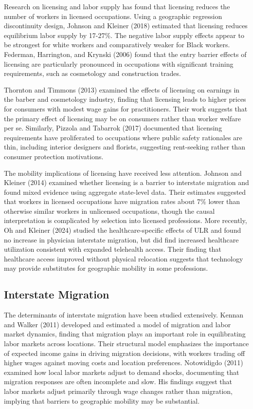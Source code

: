 \documentclass[12pt]{article}
\begin{document}
Research on licensing and labor supply has found that licensing reduces the number of workers in licensed occupations. Using a geographic regression discontinuity design, Johnson and Kleiner (2018) estimated that licensing reduces equilibrium labor supply by 17-27\%. The negative labor supply effects appear to be strongest for white workers and comparatively weaker for Black workers. Federman, Harrington, and Krynski (2006) found that the entry barrier effects of licensing are particularly pronounced in occupations with significant training requirements, such as cosmetology and construction trades.

Thornton and Timmons (2013) examined the effects of licensing on earnings in the barber and cosmetology industry, finding that licensing leads to higher prices for consumers with modest wage gains for practitioners. Their work suggests that the primary effect of licensing may be on consumers rather than worker welfare per se. Similarly, Pizzola and Tabarrok (2017) documented that licensing requirements have proliferated to occupations where public safety rationales are thin, including interior designers and florists, suggesting rent-seeking rather than consumer protection motivations.

The mobility implications of licensing have received less attention. Johnson and Kleiner (2014) examined whether licensing is a barrier to interstate migration and found mixed evidence using aggregate state-level data. Their estimates suggested that workers in licensed occupations have migration rates about 7\% lower than otherwise similar workers in unlicensed occupations, though the causal interpretation is complicated by selection into licensed professions. More recently, Oh and Kleiner (2024) studied the healthcare-specific effects of ULR and found no increase in physician interstate migration, but did find increased healthcare utilization consistent with expanded telehealth access. Their finding that healthcare access improved without physical relocation suggests that technology may provide substitutes for geographic mobility in some professions.

\subsection{Interstate Migration}

The determinants of interstate migration have been studied extensively. Kennan and Walker (2011) developed and estimated a model of migration and labor market dynamics, finding that migration plays an important role in equilibrating labor markets across locations. Their structural model emphasizes the importance of expected income gains in driving migration decisions, with workers trading off higher wages against moving costs and location preferences. Notowidigdo (2011) examined how local labor markets adjust to demand shocks, documenting that migration responses are often incomplete and slow. His findings suggest that labor markets adjust primarily through wage changes rather than migration, implying that barriers to geographic mobility may be substantial.
\end{document}
